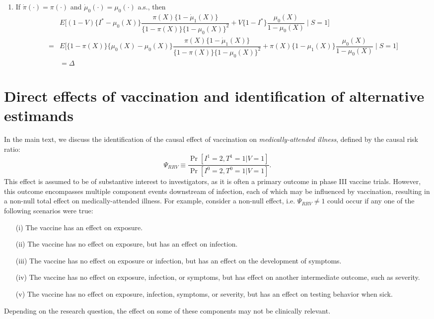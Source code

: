\begin{appendix}
\begin{enumerate}
    \item If $\dot\pi(\cdot)=\pi(\cdot)$ and $\dot\mu_0(\cdot)=\mu_0(\cdot)$ a.s., then 
\begin{align*}
    &E\bigg[ (1-V)\{I^* -  \mu_0(X)\}\dfrac{\pi(X)\{1 - \dot\mu_1(X)\}}{\{1 - \pi(X)\}\{1 - \mu_0(X)\}^2} + V\{1-I^*\}\dfrac{\mu_0(X)}{1-\mu_0(X)}\mid S=1\bigg]\\
    =& E\bigg[ \{1 - \pi(X)\}\{\mu_0(X) -  \mu_0(X)\}\dfrac{\pi(X)\{1 - \dot\mu_1(X)\}}{\{1 - \pi(X)\}\{1 - \mu_0(X)\}^2} + \pi(X)\{1-\mu_1(X)\}\dfrac{\mu_0(X)}{1-\mu_0(X)}\mid S=1\bigg]\\
    &= \Delta
\end{align*}


    \end{enumerate}
    
    \newpage
    \section{Direct effects of vaccination and identification of alternative estimands}
    In the main text, we discuss the identification of the causal effect of vaccination on \textit{medically-attended illness}, defined by the causal risk ratio:
    \[\Psi_{RRV} \equiv \dfrac{\Pr[I^1 = 2, T^1 =1 | V = 1]}{\Pr[I^0 = 2, T^0 =1 | V = 1]}.\]
    This effect is assumed to be of substantive interest to investigators, as it is often a primary outcome in phase III vaccine trials. However, this outcome encompasses multiple component events downstream of infection, each of which may be influenced by vaccination, resulting in a non-null total effect on medically-attended illness. For example, consider a non-null effect, i.e. $\Psi_{RRV} \neq 1$ could occur if any one of the following scenarios were true:
    \begin{itemize}
        \item[(i)] The vaccine has an effect on exposure.
        \item[(ii)] The vaccine has no effect on exposure, but has an effect on infection.
        \item[(iii)] The vaccine has no effect on exposure or infection, but has an effect on the development of symptoms.
        \item[(iv)] The vaccine has no effect on exposure, infection, or symptoms, but has effect on another intermediate outcome, such as severity.
        \item[(v)] The vaccine has no effect on exposure, infection, symptoms, or severity, but has an effect on testing behavior when sick.
    \end{itemize}
    Depending on the research question, the effect on some of these components may not be clinically relevant. 
    

\end{appendix}
